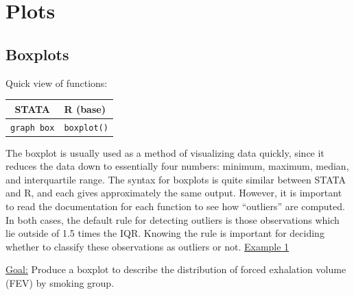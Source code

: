 \documentclass[landscape]{article}
\renewenvironment{Schunk}{\vspace{\topsep}}{\vspace{\topsep}}
\begin{document}

\section{Plots}
\subsection{Boxplots}
Quick view of functions:\\
\begin{tabular}{c|l}
STATA & R (base) \\
\hline
\texttt{graph box} & \texttt{boxplot()}
\end{tabular}

The boxplot is usually used as a method of visualizing data quickly, since it reduces the data down to essentially four numbers: minimum, maximum, median, and interquartile range. The syntax for boxplots is quite similar between STATA and R, and each gives approximately the same output. However, it is important to read the documentation for each function to see how ``outliers'' are computed. In both cases, the default rule for detecting outliers is those observations which lie outside of 1.5 times the IQR. Knowing the rule is important for deciding whether to classify these observations as outliers or not.
\newline
\noindent \underline{Example 1}

\underline{Goal:} Produce a boxplot to describe the distribution of forced exhalation volume (FEV) by smoking group.
\end{document}
